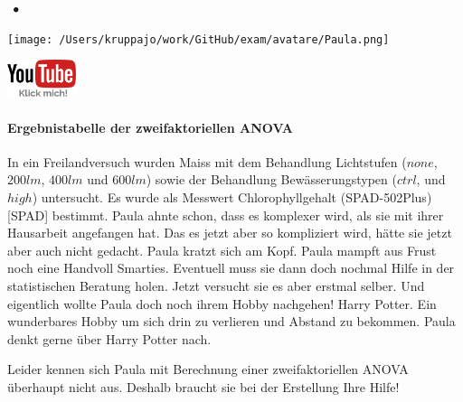 \documentclass[a4paper, 9pt]{scrartcl}\usepackage[]{graphicx}\usepackage[]{xcolor}
\begin{document}
 
\ifcollection
\begin{flushright}
\tiny\vspace{-3Ex}
\textbf{\examinhaltstart}
\exammodulestatversuch $\;\bullet$
\exammodulebiostat
\vspace{-4Ex}
\end{flushright}
\begin{minipage}[t]{0.5\textwidth}
\texttt{[image: /Users/kruppajo/work/GitHub/exam/avatare/Paula.png]}
\end{minipage}
\begin{minipage}[t]{0.5\textwidth}
\hfill
\href{https://youtu.be/8Pb2sKUIMyk}{\includegraphics[width = 2cm]{img/youtube}}
\end{minipage}
\vspace{-3Ex}
\fi



\ifcollection
\paragraph{Ergebnistabelle der zweifaktoriellen ANOVA}
\fi

In ein Freilandversuch wurden Maiss mit dem Behandlung Lichtstufen ($none$, $200lm$, $400lm$ und $600lm$) sowie der Behandlung Bewässerungstypen ($ctrl$, und $high$) untersucht. Es wurde als Messwert Chlorophyllgehalt (SPAD-502Plus) [SPAD] bestimmt. Paula ahnte schon, dass es komplexer wird, als sie mit ihrer Hausarbeit angefangen hat. Das es jetzt aber so kompliziert wird, hätte sie jetzt aber auch nicht gedacht. Paula kratzt sich am Kopf. Paula mampft aus Frust noch eine Handvoll Smarties. Eventuell muss sie dann doch nochmal Hilfe in der statistischen Beratung holen. Jetzt versucht sie es aber erstmal selber. Und eigentlich wollte Paula doch noch ihrem Hobby nachgehen! Harry Potter. Ein wunderbares Hobby um sich drin zu verlieren und Abstand zu bekommen. Paula denkt gerne über Harry Potter nach.



\vspace{1ex}

Leider kennen sich Paula mit Berechnung einer zweifaktoriellen ANOVA überhaupt nicht aus. Deshalb braucht sie bei der Erstellung Ihre Hilfe! 
\end{document}
